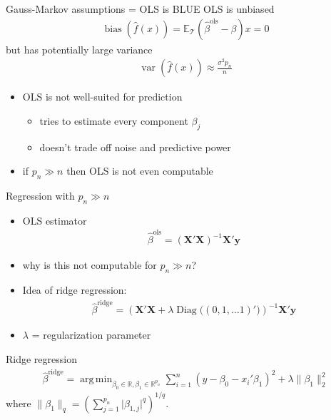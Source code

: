 \documentclass[xcolor=dvipsnames, handout]{beamer}
\newcommand{\E}{\mathbb{E}}
\DeclareMathOperator{\bias}{bias}
\DeclareMathOperator{\var}{var}
\DeclareMathOperator{\diag}{Diag}
\DeclareMathOperator{\argmin}{arg\,min}
\begin{document}
\begin{frame}{Gauss-Markov assumptions = OLS is BLUE}
OLS is unbiased 
\begin{align*}
  \bias \left(\hat{f}(x) \right) = \E_{\mathcal{T}} \left(\hat{\beta}^{\text{ols}} - \beta \right) x = 0
\end{align*}
but has potentially large variance
\begin{align*}
  \var \left(\hat{f} (x) \right) \approx \frac{\sigma^2 p_n}{n}
\end{align*}
\begin{itemize}
  \item OLS is not well-suited for prediction
  \begin{itemize}
    \item
    tries to estimate every component $\beta_j$
    \item 
    doesn't trade off noise and predictive power
  \end{itemize}
  \item if $p_n \gg n$ then OLS is not even computable
\end{itemize}
\end{frame}


\begin{frame}{Regression with $p_n \gg n$}
\begin{itemize}
  \item OLS estimator
  \begin{align*}
    \hat{\beta}^{\text{ols}} = \left(\mathbf{X}'\mathbf{X}\right)^{-1} \mathbf{X}' \mathbf{y}
  \end{align*}
  \item why is this not computable for $p_n \gg n$?
  \pause
  \item Idea of ridge regression:
  \begin{align*}
    \hat{\beta}^{\text{ridge}} = \left(\mathbf{X}'\mathbf{X} + \lambda \diag\big((0, 1, \dotsc 1)'\big) \right)^{-1} \mathbf{X}' \mathbf{y}
  \end{align*}
  \item $\lambda$ = regularization parameter
\end{itemize}
\end{frame}


\begin{frame}{Ridge regression}
\begin{align*}
  \hat{\beta}^{\text{ridge}} = \argmin_{\beta_0 \in \mathbb{R}, \beta_1 \in \mathbb{R}^{p_n}} \sum_{i=1}^n \left(y - \beta_0 - x_i'\beta_1\right)^2 + \lambda \lVert \beta_1 \rVert_2^2 
\end{align*}
where $\lVert \beta_1 \rVert_q = \left(\sum_{j=1}^{p_n} \lvert \beta_{1, j} \rvert^q \right)^{1/q}$.
\end{frame}
\end{document}
